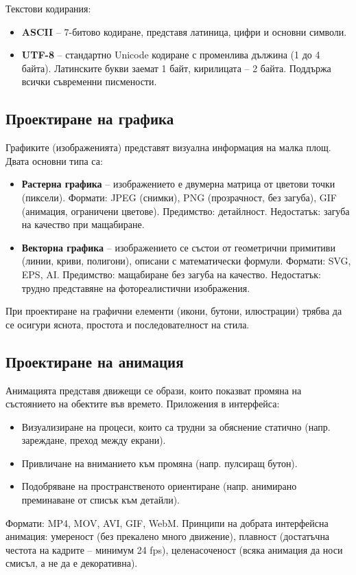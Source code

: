 \documentclass{scrartcl}
\begin{document}
\begin{FlushLeft}
Текстови кодирания:
\begin{itemize}
    \item \textbf{ASCII} – 7-битово кодиране, представя латиница, цифри и основни символи.
    \item \textbf{UTF-8} – стандартно Unicode кодиране с променлива дължина (1 до 4 байта). Латинските букви заемат 1 байт, кирилицата – 2 байта. Поддържа всички съвременни писмености.
\end{itemize}

\subsection{Проектиране на графика}

Графиките (изображенията) представят визуална информация на малка площ. Двата основни типа са:

\begin{itemize}
    \item \textbf{Растерна графика} – изображението е двумерна матрица от цветови точки (пиксели). Формати: JPEG (снимки), PNG (прозрачност, без загуба), GIF (анимация, ограничени цветове). Предимство: детайлност. Недостатък: загуба на качество при мащабиране.
    \item \textbf{Векторна графика} – изображението се състои от геометрични примитиви (линии, криви, полигони), описани с математически формули. Формати: SVG, EPS, AI. Предимство: мащабиране без загуба на качество. Недостатък: трудно представяне на фотореалистични изображения.
\end{itemize}

При проектиране на графични елементи (икони, бутони, илюстрации) трябва да се осигури яснота, простота и последователност на стила.

\subsection{Проектиране на анимация}

Анимацията представя движещи се образи, които показват промяна на състоянието на обектите във времето. Приложения в интерфейса:
\begin{itemize}
    \item Визуализиране на процеси, които са трудни за обяснение статично (напр. зареждане, преход между екрани).
    \item Привличане на вниманието към промяна (напр. пулсиращ бутон).
    \item Подобряване на пространственото ориентиране (напр. анимирано преминаване от списък към детайли).
\end{itemize}
Формати: MP4, MOV, AVI, GIF, WebM. Принципи на добрата интерфейсна анимация: умереност (без прекалено много движение), плавност (достатъчна честота на кадрите – минимум 24 fps), целенасоченост (всяка анимация да носи смисъл, а не да е декоративна).


\end{FlushLeft}
\end{document}

